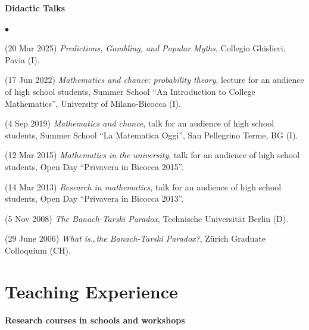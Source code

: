 \documentclass[a4paper,11pt,oneside]{amsart}
\newenvironment{myitemize}{%
\begin{list}{$\bullet$}%
 	{%
	\setlength{\itemsep}{0.3em}%
	\setlength{\topsep}{0.3em}%
	\setlength{\partopsep}{0em}%
	\setlength{\parsep}{0em}%
	\setlength{\parskip}{0em}%
	\setlength\leftmargin{1.5em}%
	\setlength\labelwidth{1.1em}%
	\setlength{\labelsep}{0.4em}%
	}%
	}%
{\end{list}}
\renewenvironment{itemize}{
\begin{myitemize}}%
{\end{myitemize}}
\begin{document}

\medskip
{\large\sf \bfseries Didactic Talks}
\smallskip

\begin{itemize}
\item (20 Mar 2025)
\emph{Predictions, Gambling, and Popular Myths},
Collegio Ghislieri, Pavia (I).

\item (17 Jun 2022) \emph{Mathematics and chance: probability theory},
lecture for an audience of high school students,
Summer School ``An Introduction to College Mathematics'',
University of Milano-Bicocca (I).

\item (4 Sep 2019) \emph{Mathematics and chance},
talk for an audience of high school students,
Summer School ``La Matematica Oggi'',
San Pellegrino Terme, BG (I).

\item (12 Mar 2015) \emph{Mathematics in the university},
talk for an audience of high school students, Open Day
``Privavera in Bicocca 2015''.

\item (14 Mar 2013) \emph{Research in mathematics},
talk for an audience of high school students, Open Day
``Privavera in Bicocca 2013''.

\item (5 Nov 2008) \emph{The Banach-Tarski Paradox},
Technische Universit\"at Berlin (D).

\item (29 June 2006) \emph{What is\ldots the Banach-Tarski Paradox?},
Z\"urich Graduate Colloquium (CH).
\end{itemize}



\section{Teaching Experience}

\nopagebreak



\medskip
{\large\sf \bfseries Research courses in schools and workshops}
\smallskip
\end{document}
